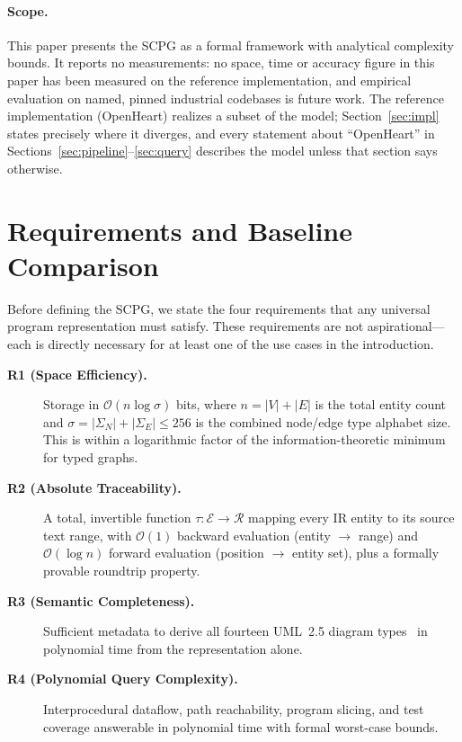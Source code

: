 \documentclass[journal,10pt,twoside]{IEEEtran}
\newcommand{\SigN}{\Sigma_{\!N}}
\newcommand{\SigE}{\Sigma_{\!E}}
\newcommand{\tauF}{\tau}
\newcommand{\BigO}{\mathcal{O}}
\begin{document}
\paragraph{Scope.}
This paper presents the SCPG as a formal framework with
analytical complexity bounds.  It reports no measurements:
no space, time or accuracy figure in this paper has been
measured on the reference implementation, and empirical
evaluation on named, pinned industrial codebases is future
work.  The reference implementation (OpenHeart) realizes a
subset of the model; Section~\ref{sec:impl} states precisely
where it diverges, and every statement about ``OpenHeart'' in
Sections~\ref{sec:pipeline}--\ref{sec:query} describes the
model unless that section says otherwise.

\section{Requirements and Baseline Comparison}
\label{sec:problem}

Before defining the SCPG, we state the four requirements that
any universal program representation must satisfy.  These
requirements are not aspirational---each is directly necessary
for at least one of the use cases in the introduction.

\begin{description}
\item[\textbf{R1 (Space Efficiency).}] Storage in
  $\BigO(n\log\sigma)$ bits, where $n = |V| + |E|$ is the
  total entity count and $\sigma = |\SigN| + |\SigE| \le 256$
  is the combined node/edge type alphabet size.  This is
  within a logarithmic factor of the information-theoretic
  minimum for typed graphs.

\item[\textbf{R2 (Absolute Traceability).}] A total,
  invertible function $\tauF : \mathcal{E} \to \mathcal{R}$
  mapping every IR entity to its source text range, with
  $\BigO(1)$ backward evaluation (entity $\to$ range) and
  $\BigO(\log n)$ forward evaluation (position $\to$ entity
  set), plus a formally provable roundtrip property.

\item[\textbf{R3 (Semantic Completeness).}] Sufficient
  metadata to derive all fourteen UML~2.5
  diagram types~\cite{uml25} in polynomial time from the
  representation alone.

\item[\textbf{R4 (Polynomial Query Complexity).}]
  Interprocedural dataflow, path reachability, program
  slicing, and test coverage answerable in polynomial time
  with formal worst-case bounds.
\end{description}
\end{document}
